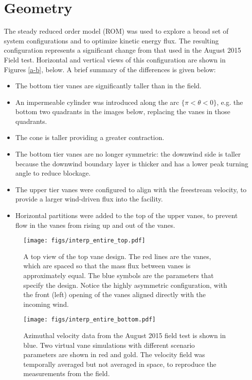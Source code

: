 \label{sec:field}

\section{Geometry}

The steady reduced order model (ROM) was used to explore a broad set of
system configurations and to optimize kinetic energy flux. The resulting
configuration represents a significant change from that used in the
August 2015 Field test. Horizontal and vertical views of this
configuration are shown in Figures \ref{a-b}, below. A brief summary of
the differences is given below: 

\begin{itemize}
\item The bottom tier vanes are significantly taller than in the field.
\item An impermeable cylinder was introduced along the arc $\{\pi < \theta
      < 0 \}$, e.g. the bottom two quadrants in the images below, replacing the
vanes in those quadrants. 
\item The cone is taller providing a greater contraction.
\item The bottom tier vanes are no longer symmetric: the downwind side is
taller because the downwind boundary layer is thicker and has a lower
peak turning angle to reduce blockage.
\item The upper tier vanes were configured to align with the freestream
velocity, to provide a larger wind-driven flux into the facility.
\item Horizontal partitions were added to the top of the upper vanes, to
prevent flow in the vanes from rising up and out of the vanes. 
\end{itemize}

 \begin{figure}[!htb]
  \begin{center}
   \texttt{[image: figs/interp\_entire\_top.pdf]}
   \caption{A top view of the top vane design. The red lines are the
     vanes, which are spaced so that the mass flux between vanes is
     approximately equal. The blue symbols are the parameters that
     specify the design. Notice the highly asymmetric configuration,
     with the front (left) opening of the vanes aligned directly with
     the incoming wind.}
   \label{fig:top_design}
  \end{center}
 \end{figure}


 \begin{figure}[!htb]
  \begin{center}
   \texttt{[image: figs/interp\_entire\_bottom.pdf]}
   \caption{Azimuthal velocity data from the August 2015 field test is
   shown in blue. Two virtual vane simulations with different scenario
   parameters are shown in red and gold. The velocity field was
   temporally averaged but not averaged in space, to reproduce
   the measurements from the field.}
   \label{fig:bottom_design}
  \end{center}
 \end{figure}

